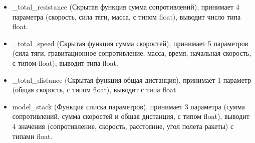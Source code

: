 \documentclass[a4paper, 12pt]{report}
\begin{document}
\begin{itemize}
        \begin{itemize}
            \item \_total\_resistance (Скрытая функция сумма сопротивлений), принимает 4 параметра (скорость, сила тяги, масса, с типом float), выводит число типа float.
            \item \_total\_speed (Скрытая функция сумма скоростей), принимает 5 параметров (сила тяги, гравитационное сопротивление, масса, время, начальная скорость, с типом float), выводит типа float.
            \item \_total\_distance (Скрытая функция общая дистанция), принимает 1 параметр (общая скорость, с типом float), выводит с типа float.
            \item model\_stack (Функция списка параметров), принимает 3 параметра (сумма сопротивлений, сумма скоростей и общая дистанция, с типом float), выводит 4 значения (сопротивление, скорость, расстояние, угол полета ракеты) с типами float.
        \end{itemize}
\end{itemize}
\end{document}
